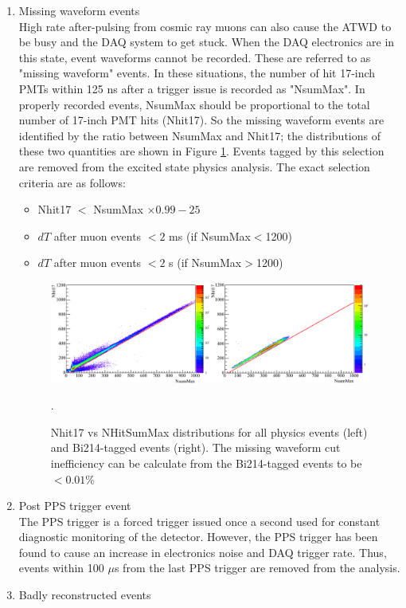 \begin{enumerate}
	\item Missing waveform events \\
	High rate after-pulsing from cosmic ray muons can also cause the ATWD to be busy and the DAQ system to get stuck. When the DAQ electronics are in this state, event waveforms cannot be recorded. These are referred to as "missing waveform" events. In these situations, the number of hit 17-inch PMTs within 125 ns after a trigger issue is recorded as "NsumMax". In properly recorded events, NsumMax should be proportional to the total number of 17-inch PMT hits (Nhit17). So the missing waveform events are identified by the ratio between NsumMax and Nhit17; the distributions of these two quantities are shown in Figure \ref{fig:missing_waveform}. Events tagged by this selection are removed from the excited state physics analysis. The exact selection criteria are as follows:
	\begin{itemize}
		\item Nhit17 $<$ NsumMax $\times 0.99-25$
		\item $dT$ after muon events $< 2$ ms (if NsumMax$<$1200)
		\item $dT$ after muon events $< 2$ s (if NsumMax$>$1200)
	\end{itemize}
	\begin{figure}[htb]
		\centering
        \includegraphics[scale=0.45]{missing_waveform.png}
        \caption{Nhit17 vs NHitSumMax distributions for all physics events (left) and Bi214-tagged events (right). The missing waveform cut inefficiency can be calculate from the Bi214-tagged events to be $< 0.01\%$}.
        \label{fig:missing_waveform}
	\end{figure}
	\item Post PPS trigger event \\
	The PPS trigger is a forced trigger issued once a second used for constant diagnostic monitoring of the detector. However, the PPS trigger has been found to cause an increase in electronics noise and DAQ trigger rate. Thus, events within 100 $\mu$s from the last PPS trigger are removed from the analysis.
	\item Badly reconstructed events \\

\end{enumerate}
